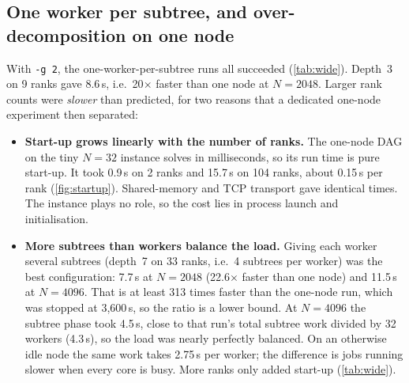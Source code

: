 \documentclass[11pt,a4paper]{article}
\newcommand{\opt}[1]{\texttt{#1}}
\begin{document}
\subsection{One worker per subtree, and over-decomposition on one node}
\label{sec:node}
With \opt{-g 2}, the one-worker-per-subtree runs all succeeded (\cref{tab:wide}). Depth~3
on 9 ranks gave 8.6\,s, i.e.\ 20$\times$ faster than one node at $N=2048$. Larger rank
counts were \emph{slower} than predicted, for two reasons that a dedicated one-node
experiment then separated:
\begin{itemize}
\item \textbf{Start-up grows linearly with the number of ranks.} The one-node DAG on the
      tiny $N=32$ instance solves in milliseconds, so its run time is pure start-up. It
      took 0.9\,s on 2 ranks and 15.7\,s on 104 ranks, about 0.15\,s per rank
      (\cref{fig:startup}). Shared-memory and TCP transport gave identical times. The
      instance plays no role, so the cost lies in process launch and initialisation.
\item \textbf{More subtrees than workers balance the load.} Giving each worker several
      subtrees (depth~7 on 33 ranks, i.e.\ 4 subtrees per worker) was the best
      configuration: 7.7\,s at $N=2048$ (22.6$\times$ faster than one node) and 11.5\,s at
      $N=4096$. That is at least 313 times faster than the one-node run, which was stopped
      at 3{,}600\,s, so the ratio is a lower bound. At $N=4096$ the subtree phase took 4.5\,s, close
      to that run's total subtree work divided by 32 workers (4.3\,s), so the load was
      nearly perfectly balanced. On an otherwise idle node the same work takes 2.75\,s per
      worker; the difference is jobs running slower when every core is busy. More ranks only
      added start-up (\cref{tab:wide}).
\end{itemize}
\end{document}
